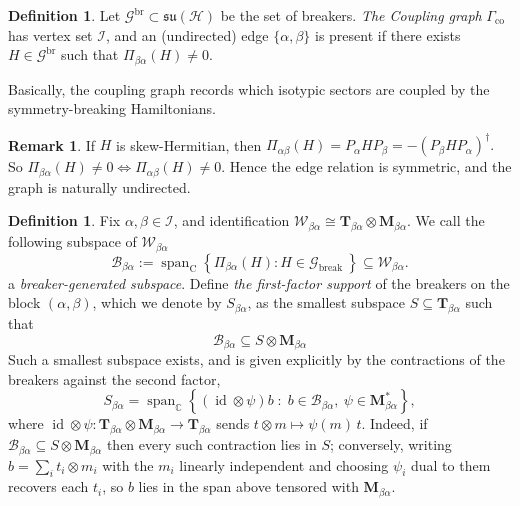 \documentclass[10pt,twocolumn,superscriptaddress,aps,amsmath,amssymb,citeautoscript,floatfix,prx]{revtex4-2}
\theoremstyle{plain}
\theoremstyle{plain}
\theoremstyle{plain}
\theoremstyle{plain}
\theoremstyle{plain}
\theoremstyle{plain}
\newcommand{\C}{\mathbb{C}}
\newcommand{\HH}{\mathcal{H}}
\theoremstyle{plain}
\theoremstyle{definition}
\newtheorem{smdefinition}[smtheorem]{Definition}
\newtheorem{smremark}[smtheorem]{Remark}
\theoremstyle{plain}
\begin{document}
\begin{appendix}
\begin{smdefinition}\label{def:coupling_graph}
    Let $\mathcal{G}^{\text{br}} \subset \mathfrak{su}(\HH)$ be the set of breakers. \textit{The Coupling graph} $\Gamma_{\mathrm{co}}$ has vertex set $\mathcal{I}$, and an (undirected) edge $\{\alpha, \beta\}$ is present if there exists $H \in \mathcal{G}^{\text{br}}$ such that
$
\Pi_{\beta \alpha}(H) \neq 0 .
$    
\end{smdefinition}

Basically, the coupling graph records which isotypic sectors are coupled by the symmetry-breaking Hamiltonians.

\begin{smremark}
    If $H$ is skew-Hermitian, then
    $
    \Pi_{\alpha \beta}(H)=P_\alpha H P_\beta=-\left(P_\beta H P_\alpha\right)^{\dagger}.
    $
    So
    $
    \Pi_{\beta \alpha}(H) \neq 0 \Longleftrightarrow \Pi_{\alpha \beta}(H) \neq 0 .
    $
    Hence the edge relation is symmetric, and the graph is naturally undirected.
\end{smremark}

\begin{smdefinition}\label{def:breaker_generated_subspace}
    Fix $\alpha, \beta \in \mathcal{I}$, and identification
    $
    \mathcal{W}_{\beta \alpha} \cong \mathbf{T}_{\beta \alpha} \otimes \mathbf{M}_{\beta \alpha}.
    $
    We call the following subspace of $\mathcal{W}_{\beta \alpha}$ 
    $$
    \mathcal{B}_{\beta \alpha}:=\operatorname{span}_{\mathrm{C}}\left\{\Pi_{\beta \alpha}(H): H \in \mathcal{G}_{\text {break }}\right\} \subseteq \mathcal{W}_{\beta \alpha} .
    $$
    a \textit{breaker-generated subspace}. Define \textit{the first-factor support} of the breakers on the block $(\alpha, \beta)$, which we denote by $S_{\beta \alpha}$, as the smallest subspace $S \subseteq \mathbf{T}_{\beta \alpha}$ such that
    $$
    \mathcal{B}_{\beta \alpha} \subseteq S \otimes \mathbf{M}_{\beta \alpha}
    $$
    Such a smallest subspace exists, and is given explicitly by the contractions of the breakers against the second factor,
    $$
    S_{\beta\alpha}=\operatorname{span}_\C\left\{\left(\operatorname{id}\otimes\psi\right)b\;:\;b\in\mathcal B_{\beta\alpha},\ \psi\in\mathbf M_{\beta\alpha}^*\right\},
    $$
    where $\operatorname{id}\otimes\psi:\mathbf T_{\beta\alpha}\otimes\mathbf M_{\beta\alpha}\to\mathbf T_{\beta\alpha}$ sends $t\otimes m\mapsto\psi(m)\,t$. Indeed, if $\mathcal B_{\beta\alpha}\subseteq S\otimes\mathbf M_{\beta\alpha}$ then every such contraction lies in $S$; conversely, writing $b=\sum_i t_i\otimes m_i$ with the $m_i$ linearly independent and choosing $\psi_i$ dual to them recovers each $t_i$, so $b$ lies in the span above tensored with $\mathbf M_{\beta\alpha}$.
\end{smdefinition}


\end{appendix}
\end{document}
